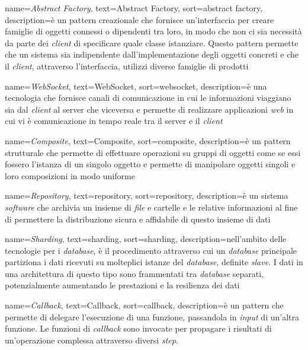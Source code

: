 {
  name=\emph{Abstract Factory},
  text=Abstract Factory,
  sort=abstract factory,
  description={è un \gls{pattern} creazionale che fornisce un'interfaccia per creare famiglie di oggetti connessi o dipendenti tra loro, in modo che non ci sia necessità da parte dei \emph{client} di specificare quale classe istanziare. Questo pattern permette che un sistema sia indipendente dall'implementazione degli oggetti concreti e che il \emph{client}, attraverso l'interfaccia, utilizzi diverse famiglie di prodotti}
}

{
  name=\emph{WebSocket},
  text=WebSocket,
  sort=websocket,
  description={è una tecnologia che fornisce canali di comunicazione in cui le informazioni viaggiano sia dal \emph{client} al server che viceversa e permette di realizzare applicazioni \emph{web} in cui vi è comunicazione in tempo reale tra il server e il \emph{client}}
}

{
  name=\emph{Composite},
  text=Composite,
  sort=composite,
  description={è un \gls{pattern} strutturale che permette di effettuare operazioni su gruppi di oggetti come se essi fossero l'istanza di un singolo oggetto e permette di manipolare oggetti singoli e loro composizioni in modo uniforme}
}

{
  name=\emph{Repository},
  text=repository,
  sort=repository,
  description={è un sistema \emph{software} che archivia un insieme di \emph{file} e cartelle e le relative informazioni al fine di permettere la distribuzione sicura e affidabile di questo insieme di dati}
}

{
  name=\emph{Sharding},
  text=sharding,
  sort=sharding,
  description={nell'ambito delle tecnologie per i \emph{database}, è il procedimento attraverso cui un \emph{database} principale partiziona i dati ricevuti su molteplici istanze del \emph{database}, definite \emph{slave}. I dati in una architettura di questo tipo sono frammentati tra \emph{database} separati, potenzialmente aumentando le prestazioni e la resilienza dei dati}
}

{
  name=\emph{Callback},
  text=Callback,
  sort=callback,
  description={è un \gls{pattern} che permette di delegare l'esecuzione di una funzione, passandola in \emph{input} di un'altra funzione. Le funzioni di \emph{callback} sono invocate per propagare i risultati di un'operazione complessa attraverso diversi \emph{step}.}
}
